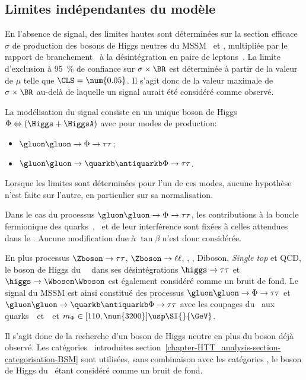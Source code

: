 \subsection{Limites indépendantes du modèle}\label{chapter-HTT_analysis-section-signal_extraction-model_indep_and_likelihood}
En l'absence de signal, des limites hautes sont déterminées sur la section efficace $\sigma$ de production des bosons de Higgs neutres du MSSM \Higgs\ et \HiggsA, multipliée par le rapport de branchement \BR\ à la désintégration en paire de leptons~\tau.
La limite d'exclusion à \SI{95}{\%} de confiance sur $\sigma\times\BR$ est déterminée à partir de la valeur de $\mu$ telle que $\CLS = \num{0.05}$.
Il s'agit donc de la valeur maximale de $\sigma\times\BR$ au-delà de laquelle un signal aurait été considéré comme observé.
\par
La modélisation du signal consiste en un unique boson de Higgs $\Phi \Leftrightarrow (\Higgs + \HiggsA)$ avec pour modes de production:
\begin{itemize}
\item $\gluon\gluon\to\Phi\to\tau\tau$;
\item $\gluon\gluon\to\quarkb\antiquarkb\Phi\to\tau\tau$.
\end{itemize}
Lorsque les limites sont déterminées pour l'un de ces modes, aucune hypothèse n'est faite sur l'autre, en particulier sur sa normalisation.
\par
Dans le cas du processus $\gluon\gluon\to\Phi\to\tau\tau$, les contributions à la boucle fermionique des quarks~\quarkt, \quarkb\ et de leur interférence sont fixées à celles attendues dans le \SM.
Aucune modification due à $\tan\beta$ n'est donc considérée.
\par
En plus processus
$\Zboson\to\tau\tau$,
$\Zboson\to\ell\ell$,
\Wjets,
\ttbar,
Diboson, \emph{Single top}
et
QCD,
le boson de Higgs du \SM\ \higgs\ dans ses désintégrations
$\higgs\to\tau\tau$
et
$\higgs\to\Wboson\Wboson$
est également considéré comme un bruit de fond.
Le signal du MSSM est ainsi constitué des processus
$\gluon\gluon\to\Phi\to\tau\tau$
et
$\gluon\gluon\to\quarkb\antiquarkb\Phi\to\tau\tau$
avec les coupages du \SM\ aux quarks~\quarkt\ et~\quarkb\
et $m_\Phi\in[110, \num{3200}]\usp\SI{}{\GeV}$.
\par
Il s'agit donc de la recherche d'un boson de Higgs neutre en plus du boson déjà observé.
Les catégories \CATbsm\ introduites section~\ref{chapter-HTT_analysis-section-categorisation-BSM} sont utilisées, sans combinaison avec les catégories \CATsm, le boson de Higgs du \SM\ étant considéré comme un bruit de fond.